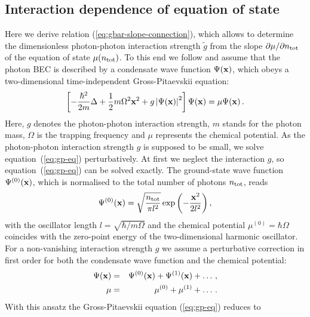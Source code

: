 \documentclass[12pt, a4paper]{iopart}
\begin{document}
\begin{appendix}
%
\section{Interaction dependence of equation of state}
\label{App:S-gbar-connection}
%
Here we derive relation (\ref{eq:gbar-slope-connection}), which allows to determine the dimensionless photon-photon interaction strength $\tilde{g}$ from the slope
$\partial \mu / \partial n_{\rm tot}$ of the equation of state $\mu ( n_{\rm tot} )$.
To this end we follow \cite{Klaers_BEC_of_photons} and assume that the photon BEC is described by a condensate wave function $\Psi({\bf x})$, which obeys
a two-dimensional time-independent Gross-Pitaevskii equation:
\begin{equation}
\label{eq:gp-eq}
\left[-\frac{\hbar^2}{2m} \Delta + \frac{1}{2} m \Omega^2 {\bf x}^2  + g \left|\Psi({\bf x})\right|^2\right] \Psi({\bf x}) = \mu \Psi({\bf x})\,.
\end{equation}
Here, $g$ denotes the photon-photon interaction strength, $m$ stands for the photon mass, $\Omega$ is the trapping frequency and $\mu$ represents the chemical potential. As the photon-photon interaction strength
$g$ is supposed to be small, we solve equation~(\ref{eq:gp-eq}) perturbatively. At first we neglect the interaction $g$, so equation~(\ref{eq:gp-eq}) can be solved exactly.
The ground-state wave function $\Psi^{(0)}({\bf x})$, which is normalised to the total number of photons $n_{\rm tot}$, reads
%
\begin{equation}
\label{eq:gp-eq-gs-wavefunction-ohne-interaction}
\Psi^{(0)}({\bf x}) = \sqrt{\frac{n_{\rm tot}}{\pi l^2}} \exp\left(- \frac{{\bf x}^2}{ 2 l^2}\right),
\end{equation}
%
with the oscillator length $l=\sqrt{\hbar/ m \Omega}$ and the chemical potential $\mu^{(0)} = \hbar \Omega$ coincides with the zero-point energy of the two-dimensional harmonic oscillator.
For a non-vanishing interaction strength $g$ we assume a perturbative correction in first order for both the condensate wave function and the chemical potential:
%
\begin{eqnarray}
\Psi({\bf x}) &=& \Psi^{(0)}({\bf x}) + \Psi^{(1)}({\bf x}) + \ldots \, ,\\
\mu &=& \mu^{(0)} + \mu^{(1)}+ \ldots \, . 
\end{eqnarray}
%
With this ansatz the Gross-Pitaevskii equation (\ref{eq:gp-eq}) reduces to 
%
\begin{equation}
  \label{pert}

\end{equation}
\end{appendix}
\end{document}
